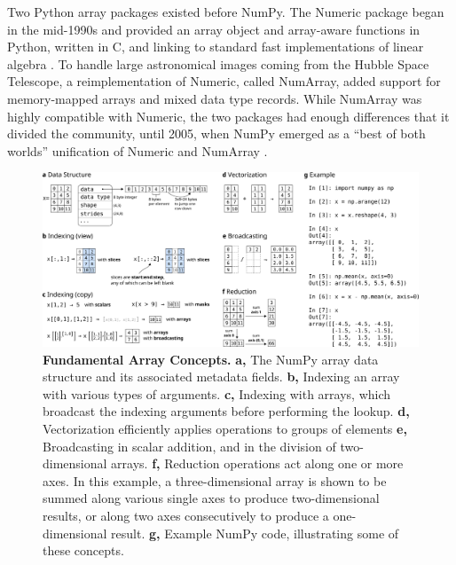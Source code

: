 Two Python array packages existed before NumPy.
The Numeric package began in the mid-1990s and provided an array object and array-aware functions
in Python, written in C, and linking to standard fast implementations of linear
algebra \cite{Numericmanual}.
To handle large astronomical images coming from the Hubble Space Telescope,
a reimplementation of Numeric, called NumArray, added
support for memory-mapped arrays and mixed data type records. 
While NumArray was highly compatible with Numeric, the two packages
had enough differences that it divided the community, until
2005, when NumPy emerged as a ``best of both worlds'' unification of Numeric
and NumArray \cite{oliphant2006guide}.

\begin{figure}[h]
  \centering
  \includegraphics[width=\textwidth]{static/sketches/concepts}
  \caption{\textbf{Fundamental Array Concepts.}
    \textbf{a,} The NumPy array data structure and its associated metadata fields.
    \textbf{b,} Indexing an array with various types of arguments.
    \textbf{c,} Indexing with arrays, which broadcast the indexing arguments before performing the lookup.
    \textbf{d,} Vectorization efficiently applies operations to groups of elements
    \textbf{e,} Broadcasting in scalar addition, and in the division of two-dimensional arrays.
    \textbf{f,} Reduction operations act along one or more axes. In this
    example, a three-dimensional array is shown to be summed along various single
    axes to produce two-dimensional results, or along two axes consecutively to
    produce a one-dimensional result.
    \textbf{g,} Example NumPy code, illustrating some of these concepts.
   }
  \label{fig:array-concepts}
\end{figure}

